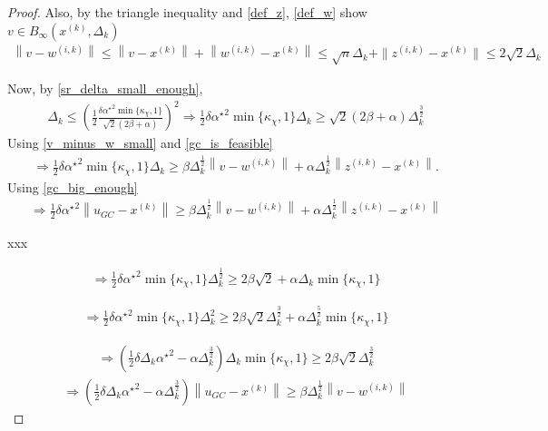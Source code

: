 \documentclass{article}
\theoremstyle{case}
\newcommand{\xk}{{x^{(k)}}}
\newcommand{\dk}{\Delta_k}
\newcommand{\zik}{{z^{(i, k)}}}
\newcommand{\wik}{{w^{(i, k)}}}
\newcommand{\minanglealpha}{{ \alpha^{\star} }}
\newcommand{\tr}{{ B_{\infty}\left(\xk, \dk\right) }}
\begin{document}
\begin{proof}
Also, by the triangle inequality and \cref{def_z}, \cref{def_w}
\color{red}show $v \in \tr$ \color{black}
\begin{align}
\left\|v - \wik\right\| \le \left\|v - \xk\right\| + \left\|\wik-\xk \right\| \le \sqrt{n}\dk + \|\zik - \xk\| \le 2\sqrt{2}\dk \label{v_minus_w_small}
\end{align}


Now, by \cref{sr_delta_small_enough},
\begin{align*}
\dk \le \left(\frac 1 2 \frac{\delta\minanglealpha^2\min\{\kappa_{\chi}, 1 \}}{\sqrt{2}\left(2\beta + \alpha\right)}\right)^2
\Longrightarrow
\frac 1 2 \delta\minanglealpha^2\min\{\kappa_{\chi}, 1 \}\dk
\ge\sqrt{2} \left(2\beta + \alpha\right)\dk^{\frac 3 2}
\end{align*}
Using \cref{v_minus_w_small} and \cref{gc_is_feasible} 
\begin{align*}
\Longrightarrow
\frac 1 2 \delta\minanglealpha^2\min\{\kappa_{\chi}, 1 \}\dk
\ge \beta \dk^{\frac 1 2} \left\|v - \wik\right\| + \alpha\dk^{\frac 1 2}\left\|\zik - \xk \right\|.
\end{align*}
Using \cref{gc_big_enough}
\begin{align*}
\Longrightarrow
\frac 1 2 \delta\minanglealpha^2 \left\|u_{GC} - \xk\right\|
\ge \beta \dk^{\frac 1 2} \left\|v - \wik\right\| + \alpha\dk^{\frac 1 2}\left\|\zik - \xk \right\|
\end{align*}

xxx


\begin{align}
\Longrightarrow
\frac 1 2 \delta\minanglealpha^2 \min\{\kappa_{\chi}, 1 \}\dk^{\frac 1 2}
\ge 2\beta\sqrt{2} + \alpha\dk \min\{\kappa_{\chi}, 1 \}
\end{align}


\begin{align}
\Longrightarrow
\frac 1 2 \delta\minanglealpha^2 \min\{\kappa_{\chi}, 1 \}\dk^2
\ge 2\beta\sqrt{2} \dk^{\frac 3 2} + \alpha\dk^{\frac 5 2} \min\{\kappa_{\chi}, 1 \}
\end{align}


\begin{align}
\Longrightarrow
\left(\frac 1 2 \delta\dk\minanglealpha^2 -\alpha\dk^{\frac 3 2}\right)\dk \min\{\kappa_{\chi}, 1 \}
\ge 2\beta\sqrt{2} \dk^{\frac 3 2}
\end{align}
\begin{align}
\Longrightarrow
\left(\frac 1 2 \delta\dk\minanglealpha^2 -\alpha\dk^{\frac 3 2}\right)\left\|u_{GC} - \xk\right\|
\ge \beta \dk^{\frac 1 2} \left\|v - \wik\right\| \label{sr_smh}
\end{align}


\end{proof}
\end{document}
